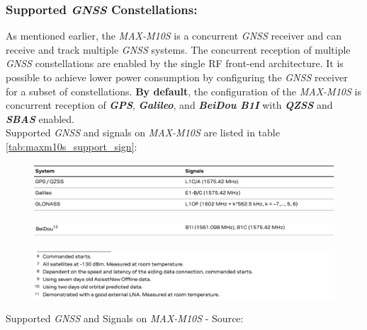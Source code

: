 \documentclass[report.tex]{subfiles}
\begin{document}
\subsubsection{Supported \textit{GNSS} Constellations:}

As mentioned earlier, the \textit{MAX-M10S} is a concurrent \textit{GNSS} receiver and can receive and track multiple \textit{GNSS} systems. The concurrent reception of multiple \textit{GNSS} constellations are enabled by the single RF front-end architecture. It is possible to achieve lower power consumption by configuring the \textit{GNSS} receiver for a subset of constellations.
\textbf{By default}, the configuration of the \textit{\textit{MAX-M10S}} is concurrent reception of \textbf{\textit{GPS}}, \textbf{\textit{Galileo}}, and \textbf{\textit{BeiDou B1I}} with \textbf{\textit{QZSS}} and \textbf{\textit{SBAS}} enabled.\\

Supported \textit{GNSS} and signals on \textit{MAX-M10S} are listed in table \ref{tab:maxm10s_support_sign}:

\begin{table}[H]
\centering
\begin{subfigure}{\textwidth}
	\centering
	\includegraphics[width=1\textwidth]{Include/Figure/comp/maxm10s_support_sign.png}
\end{subfigure}
\begin{subfigure}{\textwidth}
	\centering
	\includegraphics[width=1\textwidth]{Include/Figure/comp/maxm10s_support_sign2.png}
\end{subfigure}
\begin{subfigure}{\textwidth}
	\centering
	\includegraphics[width=1\textwidth]{Include/Figure/comp/maxm10s_support_sign3.png}
\end{subfigure}
\caption{Supported \textit{GNSS} and Signals on \textit{MAX-M10S} - Source: \cite{MAXM10S}}
\label{tab:maxm10s_support_sign}
\end{table}
\end{document}
